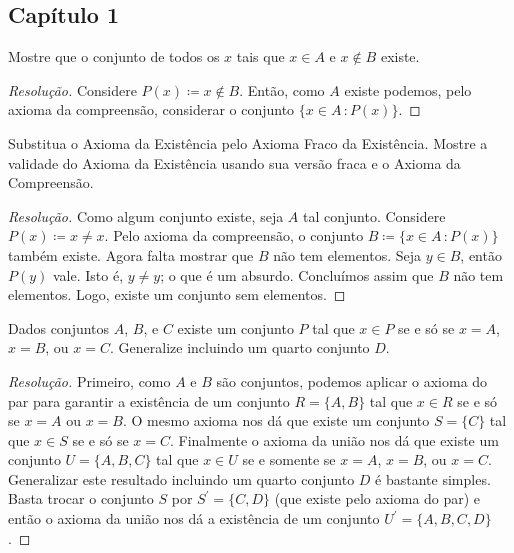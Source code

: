 \documentclass[a4paper]{article}
\begin{document}
\subsection{Capítulo 1}
\begin{exercicio}
  Mostre que o conjunto de todos os \(x\) tais que \(x\in A\) e \(x\not\in B\) existe.
\end{exercicio}
\begin{proof}[Resolução]
Considere \(P(x)\coloneqq x\not\in B\). Então, como \(A\) existe podemos, pelo axioma da compreensão, considerar o conjunto 
\(\{x\in A\,\colon P(x)\}\).
\end{proof}
\begin{exercicio}
 Substitua o Axioma da Existência pelo Axioma Fraco da Existência. Mostre a
 validade do Axioma da Existência usando sua versão fraca e o Axioma da Compreensão.
\end{exercicio}
 \begin{proof}[Resolução]
Como algum conjunto existe, seja \(A\) tal conjunto. Considere \(P(x)\coloneqq x\not= x\). 
Pelo axioma da compreensão, o conjunto \(B\coloneqq\{x\in A\,\colon P(x)\}\) também existe.
Agora falta mostrar que \(B\) não tem elementos. Seja \(y\in B\), então \(P(y)\) vale. Isto é,
\(y\not = y\); o que é um absurdo. Concluímos assim que \(B\) não tem elementos. Logo, existe um 
conjunto sem elementos.
\end{proof}
\begin{exercicio}
Dados conjuntos \(A\), \(B\), e \(C\) existe um conjunto \(P\) tal que \(x\in P\) se e só se
\(x=A\), \(x=B\), ou \(x=C\). Generalize incluindo um quarto conjunto \(D\).
\end{exercicio}
\begin{proof}[Resolução]
Primeiro, como \(A\) e \(B\) são conjuntos, podemos aplicar o axioma do par para garantir 
a existência de um conjunto \(R=\{A,B\}\) tal que \(x\in R\) se e só se \(x= A\) ou
\(x = B\). O mesmo axioma nos dá que existe um conjunto \(S=\{C\}\) tal que
\(x\in S\) se e só se \(x=C\). Finalmente o axioma da união nos dá que existe um conjunto
\(U=\{A,B,C\}\) tal que \(x\in U\) se e somente se \(x=A\), \(x=B\), ou \(x=C\).
Generalizar este resultado incluindo um quarto conjunto \(D\) é bastante
simples. Basta trocar o conjunto \(S\) por \(S^\prime=\{C,D\}\) (que existe pelo
axioma do par) e então o axioma da união nos dá a existência de um conjunto \(U^\prime=\{A,B,C,D\}\).
\end{proof}
\end{document}
